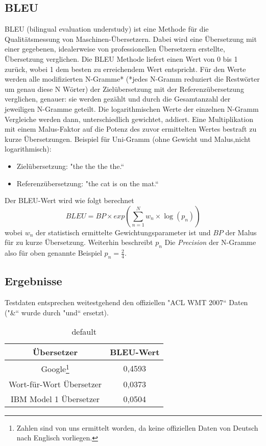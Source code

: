 \documentclass[12pt]{amsart}
\begin{document}
\subsection{BLEU}
BLEU (bilingual evaluation understudy) ist eine Methode für die Qualitätsmessung von Maschinen-Übersetzern. Dabei wird eine Übersetzung mit einer gegebenen, idealerweise von professionellen Übersetzern erstellte, Übersetzung verglichen. Die BLEU Methode liefert einen Wert von 0 bis 1 zurück, wobei 1 dem besten zu erreichendem Wert entspricht. Für den Werte werden alle modifizierten N-Gramme* (*jedes N-Gramm reduziert die Restwörter um genau diese N Wörter) der Zielübersetzung mit der Referenzübersetzung verglichen, genauer: sie werden gezählt und durch die Gesamtanzahl der jeweiligen N-Gramme geteilt. Die logarithmischen Werte der einzelnen N-Gramm Vergleiche werden dann, unterschiedlich gewichtet, addiert. Eine Multiplikation mit einem Malus-Faktor auf die Potenz des zuvor ermittelten Wertes bestraft zu kurze Übersetzungen.
Beispiel für Uni-Gramm (ohne Gewicht und Malus,nicht logarithmisch):
\begin{itemize}
\item Zielübersetzung: "the the the the.“
\item Referenzübersetzung: "the cat is on the mat.“
\end{itemize}

Der BLEU-Wert wird wie folgt berechnet
\begin{equation*}
BLEU = BP \times exp\left (\sum_{n=1}^N w_n \times \log \left ( p_n \right ) \right )
\end{equation*}
wobei $w_n$ der statistisch ermittelte Gewichtungsparameter ist und $BP$ der Malus für zu kurze Übersetzung. Weiterhin beschreibt $p_n$ Die \textit{Precision} der N-Gramme also für oben genannte Beispiel $p_n = \frac{2}{4}$.

\subsection{Ergebnisse}
Testdaten entsprechen weitestgehend den offiziellen "ACL WMT 2007“ Daten ("\&“ wurde durch "und“ ersetzt).
\begin{table}[htdp]
\caption{default}
\begin{center}
\begin{tabular}{|c|c|}
\hline
Übersetzer & BLEU-Wert \\\hline
Google\footnote{Zahlen sind von uns ermittelt worden, da keine offiziellen Daten von Deutsch nach Englisch vorliegen.} & 0,4593 \\\hline
Wort-für-Wort Übersetzer & 0,0373 \\\hline
IBM Model 1 Übersetzer & 0,0504 \\\hline
\end{tabular}
\end{center}
\label{BLEU-Werte}
\end{table}%
\end{document}
